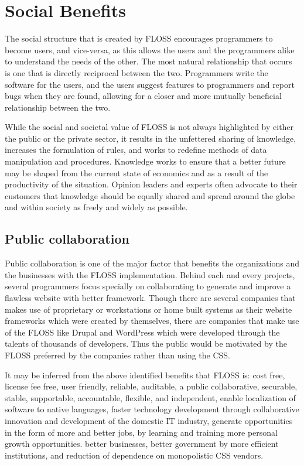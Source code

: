   \section{Social Benefits }
  The social structure that is created by FLOSS encourages programmers to become users, and vice-versa, as this allows the users and the programmers alike to understand the needs of the other. The most natural relationship that occurs is one that is directly reciprocal between the two. Programmers write the software for the users, and the users suggest features to programmers and report bugs when they are found, allowing for a closer and more mutually beneficial relationship between the two.
  
  While the social and societal value of FLOSS is not always highlighted by either the public or the private sector, it results in the unfettered sharing of knowledge, increases the formulation of rules, and works to redefine methods of data manipulation and procedures. Knowledge works to ensure that a better future may be shaped from the current state of economics and as a result of the productivity of the situation. Opinion leaders and experts often advocate to their customers that knowledge should be equally shared and spread around the globe and within society as freely and widely as possible.
  
  \subsection{Public collaboration}
  Public collaboration is one of the major factor that benefits the organizations and the businesses with the FLOSS implementation. Behind each and every projects, several programmers focus specially on collaborating to generate and improve a flawless website with better framework. Though there are several companies that makes use of proprietary or workstations or home built systems as their website frameworks which were created by themselves, there are companies that make use of the FLOSS like Drupal and WordPress which were developed through the talents of thousands of developers. Thus the public would be motivated by the FLOSS preferred by the companies rather than using the CSS.
  \newpage
  
  It may be inferred from the above identified benefits that FLOSS is: cost free, license fee free, user friendly, reliable, auditable, a public collaborative, securable, stable, supportable, accountable, flexible, and independent, enable localization of software to native languages, faster technology development through collaborative innovation and development of the domestic IT industry, generate opportunities in the form of more and better jobs, by learning and training more personal growth opportunities. better businesses, better government by more efficient institutions, and reduction of dependence on monopolistic CSS vendors.
  
